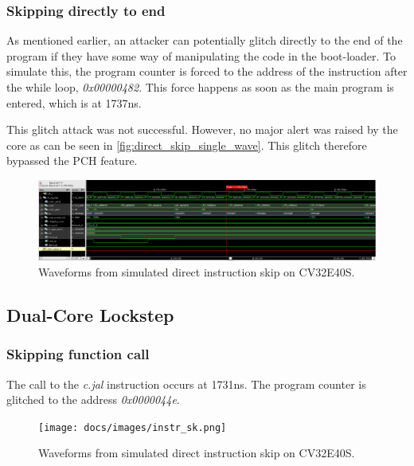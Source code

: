 \subsubsection{Skipping directly to end}

As mentioned earlier, an attacker can potentially glitch directly to the end of the program if they have some way of manipulating the code in the boot-loader. To simulate this, the program counter is forced to the address of the instruction after the while loop, \textit{0x00000482}. This force happens as soon as the main program is entered, which is at 1737ns.

This glitch attack was not successful. However, no major alert was raised by the core as can be seen in \autoref{fig:direct_skip_single_wave}. This glitch therefore bypassed the PCH feature. 

\begin{figure}[h!]
    \centering
    \includegraphics[width=\textwidth]{docs/images/direct_skip_single_core.png}
    \caption{Waveforms from simulated direct instruction skip on CV32E40S.}
    \label{fig:direct_skip_single_wave}
\end{figure}

\subsection{Dual-Core Lockstep}
\label{subsec:dual_instr_skip}

\subsubsection{Skipping function call}

The call to the \textit{c.jal} instruction occurs at 1731ns. The program counter is glitched to the address \textit{0x0000044e}. 

\begin{figure}[h!]
    \centering
    \texttt{[image: docs/images/instr\_sk.png]}
    \caption{Waveforms from simulated direct instruction skip on CV32E40S.}
    \label{fig:direct_skip_single_wave}
\end{figure}


